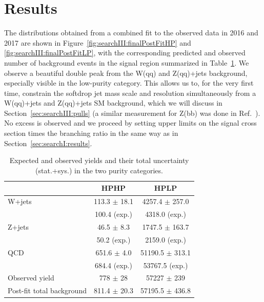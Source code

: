 \section{Results}
The distributions obtained from a combined fit to the observed data in 2016 and 2017 are shown in Figure~\ref{fig:searchIII:finalPostFitHP} and \ref{fig:searchIII:finalPostFitLP}, with the corresponding predicted and observed number of background events in the signal region summarized in Table~\ref{tab:searchIII:ObsEvents}. We observe a beautiful double peak from the W(qq) and Z(qq)+jets background, especially visible in the low-purity category. This allows us to, for the very first time, constrain the softdrop jet mass scale and resolution simultaneously from a W(qq)+jets and Z(qq)+jets SM background, which we will discuss in Section~\ref{sec:searchIII:pulls} (a similar measurement for Z(bb) was done in Ref.~\cite{Sirunyan:2284496}). No excess is observed and we proceed by setting upper limits on the signal cross section times the branching ratio in the same way as in Section~\ref{sec:searchI:results}.
\begin{table}[h!]
\centering
\begin{tabular}{lcc} 
 & HPHP & HPLP\\
 \hline
 \hline
W+jets & 113.3 $\pm$ 18.1 & 4257.4 $\pm$ 257.0 \\
            & 100.4 (exp.) & 4318.0 (exp.)\\
Z+jets & 46.5 $\pm$ 8.3 & 1747.5 $\pm$ 163.7\\
           & 50.2 (exp.) & 2159.0 (exp.) \\
QCD  & 651.6 $\pm$ 4.0 & 51190.5 $\pm$ 313.1 \\
          & 684.4 (exp.) & 53767.5 (exp.) \\
\hline
Observed yield & 778 $\pm$ 28 & 57227 $\pm$ 239\\
Post-fit total background & 811.4 $\pm$ 20.3 & 57195.5 $\pm$ 436.8\\
\hline
\hline
\end{tabular} 
\caption{Expected and observed yields and their total uncertainty (stat.+sys.) in the two purity categories.} 
\label{tab:searchIII:ObsEvents}
\end{table}

